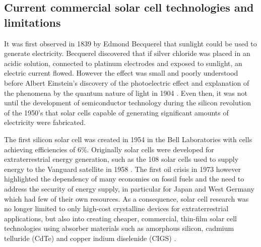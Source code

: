 \documentclass[11pt, twoside]{report}
\begin{document}


\subsection{Current commercial solar cell technologies and limitations}\label{current_tech}
It was first observed in 1839 by Edmond Becquerel that sunlight could be used to generate electricity. Becquerel discovered that if  silver chloride was placed in an acidic solution, connected to platinum electrodes and exposed to sunlight, an electric current flowed. However the effect was small and poorly understood before Albert Einstein's discovery of the photoelectric effect and explanation of the phenomena by the quantum nature of light in 1904 \cite{PV_history1}. Even then, it was not until the development of semiconductor technology during the silicon revolution of the 1950's that solar cells capable of generating significant amounts of electricity were fabricated.

The first silicon solar cell was created in 1954 in the Bell Laboratories with cells achieving efficiencies of 6\%. 
Originally solar cells were developed for extraterrestrial energy generation, such as the 108 solar cells used to supply energy to the Vanguard satellite in 1958 \cite{PV_history1}. The first oil crisis in 1973 however highlighted the dependency of many economies on fossil fuels and the need to address the security of energy supply,  in particular for Japan and West Germany which had few of their own resources. As a consequence, solar cell research was no longer limited to only high-cost crystalline devices for extraterrestrial applications, but also into creating cheaper, commercial, thin-film solar cell technologies using absorber materials such as amorphous silicon, cadmium telluride (CdTe) and copper indium diselenide (CIGS) \cite{PV_history2}.
\end{document}
